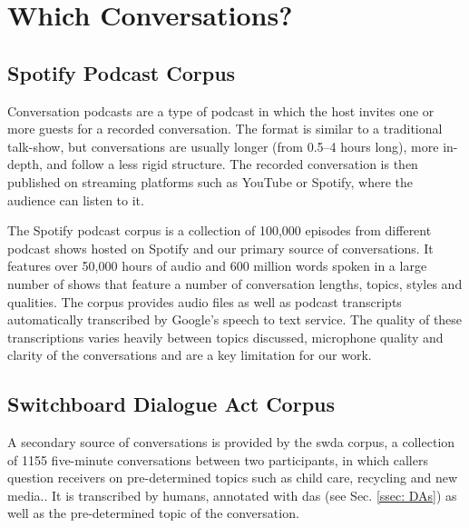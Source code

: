 \section{Which Conversations?}
    \subsection{Spotify Podcast Corpus \label{ssec: spotify corpus}}
        Conversation podcasts are a type of podcast in which the host invites one or more guests for a recorded conversation. The format is similar to a traditional talk-show, but conversations are usually longer (from 0.5--4 hours long), more in-depth, and follow a less rigid structure.  The recorded conversation is then published on streaming platforms such as YouTube or Spotify, where the audience can listen to it.
        
        The Spotify podcast corpus\cite{clifton-2020100000} is a collection of 100,000 episodes from different podcast shows hosted on Spotify and our primary source of conversations. It features over 50,000 hours of audio and 600 million words spoken in a large number of shows that feature a number of conversation lengths, topics, styles and qualities. The corpus provides audio files as well as podcast transcripts automatically transcribed by Google's speech to text service. The quality of these transcriptions varies heavily between topics discussed, microphone quality and clarity of the conversations and are a key limitation for our work.
        
    \subsection{Switchboard Dialogue Act Corpus \label{ssec: swda}}
        A secondary source of conversations is provided by the \gls{swda} corpus, a collection of 1155 five-minute conversations between two participants, in which callers question receivers on pre-determined topics such as child care, recycling and new media.\cite{fang2012annotation}. It is transcribed by humans, annotated with \glspl{da} (see Sec. \ref{ssec: DAs}) as well as the pre-determined topic of the conversation.
